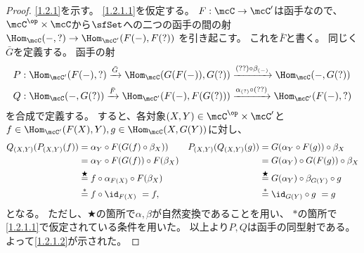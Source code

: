 \documentclass[uplatex,dvipdfmx]{jsarticle}
\begin{document}
\begin{proof}
  \ref{1.2.1}を示す。
  \ref{1.2.1.1}を仮定する。
  \(F:\mcC\to \mcC'\)は函手なので、
  \(\mcC^{\op}\times\mcC\)から\(\sfSet\)への二つの函手の間の射
  \(\Hom_{\mcC}(-,?) \to \Hom_{\mcC'}(F(-),F(?))\)
  を引き起こす。
  これを\(\bar{F}\)と書く。
  同じく\(\bar{G}\)を定義する。
  函手の射
  \begin{align*}
    &P: \Hom_{\mcC'}(F(-),?) \xrightarrow{\bar{G}} \Hom_{\mcC}(G(F(-)),G(?))
    \xrightarrow{(??)\circ \beta_{(-)}} \Hom_{\mcC}(-,G(?)) \\
    &Q: \Hom_{\mcC}(-,G(?)) \xrightarrow{\bar{F}} \Hom_{\mcC'}(F(-),F(G(?)))
    \xrightarrow{\alpha_{(?)} \circ (??)} \Hom_{\mcC'}(F(-),?)
  \end{align*}
  を合成で定義する。
  すると、各対象\((X,Y)\in \mcC^{\op}\times \mcC'\)と
  \(f\in \Hom_{\mcC'}(F(X),Y), g\in \Hom_{\mcC}(X,G(Y))\)に対し、
  \begin{align*}
    Q_{(X,Y)}(P_{(X,Y)}(f))
    &= \alpha_Y \circ F(G(f)\circ \beta_X))
    & P_{(X,Y)}(Q_{(X,Y)}(g))
    &= G(\alpha_Y \circ F(g)) \circ \beta_X \\
    &= \alpha_Y \circ F(G(f)) \circ F(\beta_X)
    &&= G(\alpha_Y) \circ G(F(g)) \circ \beta_X \\
    &\overset{\bigstar}{=} f \circ \alpha_{F(X)} \circ F(\beta_X)
    &&\overset{\bigstar}{=} G(\alpha_Y) \circ \beta_{G(Y)} \circ g \\
    &\overset{*}{=} f \circ \id_{F(X)} \ = f,
    &&\overset{*}{=} \id_{G(Y)} \circ g \ = g
  \end{align*}
  となる。
  ただし、\(\bigstar\)の箇所で\(\alpha,\beta\)が自然変換であることを用い、
  \(*\)の箇所で\ref{1.2.1.1}で仮定されている条件を用いた。
  以上より\(P,Q\)は函手の同型射である。
  よって\ref{1.2.1.2}が示された。


\end{proof}
\end{document}
